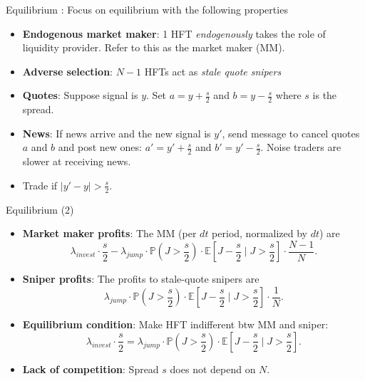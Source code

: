 \documentclass[english,10pt
,aspectratio=169
]{beamer}
\begin{document}
\begin{frame}{Equilibrium}
	: Focus on equilibrium with the following properties
	\begin{itemize}
		\item \textbf{Endogenous market maker}: 1 HFT \textit{endogenously} takes the role of liquidity provider. Refer to this as the market maker (MM).
		\item \textbf{Adverse selection}: $N-1$ HFTs act as \textit{stale quote snipers}
	\end{itemize}
	\begin{itemize}
		\item \textbf{Quotes}: Suppose signal is  $y$. Set $a=y+\frac{s}{2}$ and $b=y-\frac{s}{2}$ where $s$ is the spread.
		\item \textbf{News}: If news arrive and the new signal is $y'$, send message to cancel quotes $a$ and $b$ and post new ones: $a'=y'+\frac{s}{2}$ and $b'=y'-\frac{s}{2}$. Noise traders are slower at receiving news.
	\end{itemize}
	\begin{itemize}
		\item Trade if $|y'-y|>\frac{s}{2}$.
	\end{itemize}
\end{frame}


\begin{frame}{Equilibrium (2)}
	\begin{itemize}
		\item \textbf{Market maker profits}: The MM  (per $dt$ period, normalized by $dt$) are
		\[
		\lambda_{invest}\cdot \frac{s}{2}-\lambda_{jump}\cdot \mathbb{P}\left(J>\frac{s}{2}\right) \cdot \mathbb{E} \left[J-\frac{s}{2} \mid J>\frac{s}{2}\right] \cdot \frac{N-1}{N}.
		\]
		\item \textbf{Sniper profits}: The profits to stale-quote snipers are
		\[
		\lambda_{jump}\cdot \mathbb{P} \left(J>\frac{s}{2} \right) \cdot \mathbb{E} \left[J-\frac{s}{2} \mid J>\frac{s}{2}\right] \cdot \frac{1}{N}.
		\]
		\item \textbf{Equilibrium condition}: Make HFT indifferent btw MM and sniper:
		\[
		\lambda_{invest} \cdot \frac{s}{2} = \lambda_{jump}\cdot \mathbb{P} \left(J>\frac{s}{2} \right) \cdot \mathbb{E} \left[J-\frac{s}{2} \mid J>\frac{s}{2}\right] .
		\]
		\item \textbf{Lack of competition}: Spread $s$ does not depend on $N$.
	\end{itemize}
\end{frame}
\end{document}

